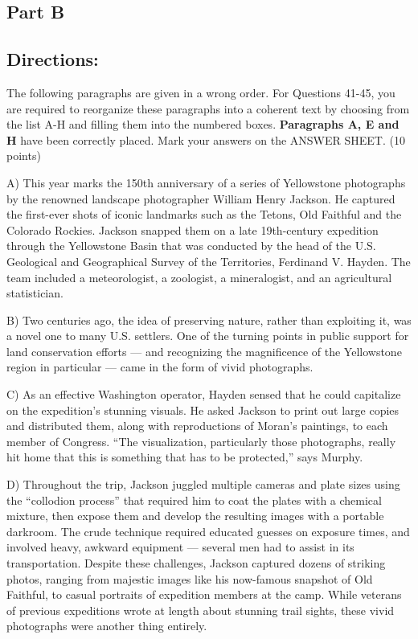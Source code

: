\documentclass[UTF8,11pt]{ctexart}
\begin{document}
\subsection*{\textbf{Part B}}


\subsection*{\textbf{Directions:}}


The following paragraphs are given in a wrong order. For Questions 41-45, you are required to reorganize these paragraphs into a coherent text by choosing from the list A-H and filling them into the numbered boxes. \textbf{Paragraphs A, E and H} have been correctly placed. Mark your answers on the ANSWER SHEET. (10 points)


A) This year marks the 150th anniversary of a series of Yellowstone photographs by the renowned landscape photographer William Henry Jackson. He captured the first-ever shots of iconic landmarks such as the Tetons, Old Faithful and the Colorado Rockies. Jackson snapped them on a late 19th-century expedition through the Yellowstone Basin that was conducted by the head of the U.S. Geological and Geographical Survey of the Territories, Ferdinand V. Hayden. The team included a meteorologist, a zoologist, a mineralogist, and an agricultural statistician.


B) Two centuries ago, the idea of preserving nature, rather than exploiting it, was a novel one to many U.S. settlers. One of the turning points in public support for land conservation efforts — and recognizing the magnificence of the Yellowstone region in particular — came in the form of vivid photographs.


C) As an effective Washington operator, Hayden sensed that he could capitalize on the expedition’s stunning visuals. He asked Jackson to print out large copies and distributed them, along with reproductions of Moran’s paintings, to each member of Congress. “The visualization, particularly those photographs, really hit home that this is something that has to be protected,” says Murphy.


D) Throughout the trip, Jackson juggled multiple cameras and plate sizes using the “collodion process” that required him to coat the plates with a chemical mixture, then expose them and develop the resulting images with a portable darkroom. The crude technique required educated guesses on exposure times, and involved heavy, awkward equipment — several men had to assist in its transportation. Despite these challenges, Jackson captured dozens of striking photos, ranging from majestic images like his now-famous snapshot of Old Faithful, to casual portraits of expedition members at the camp. While veterans of previous expeditions wrote at length about stunning trail sights, these vivid photographs were another thing entirely.
\end{document}
